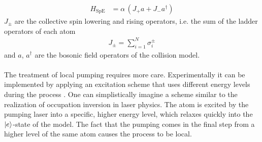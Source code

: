 \begin{align*}
    H_\text{SpE}&=\alpha\,(J_+a + J_-a^\dagger)
\end{align*}
$J_\pm$ are the collective spin lowering and rising operators, i.e. the sum of the ladder operators of each atom 
\begin{align*}
    J_\pm=\sum_{i=1}^N\sigma^\pm_i
\end{align*}
and $a$, $a^\dagger$ are the bosonic field operators of the collision model.\\\\


The treatment of local pumping requires more care. %
Experimentally it can be implemented by applying an excitation scheme that uses different energy levels during the process \cite{meiser_prospects_2009}. One can simplistically imagine a scheme similar to the realization of occupation inversion in laser physics. The atom is excited by the pumping laser into a specific, higher energy level, which relaxes quickly into the $\ket{e}$-state of the model. The fact that the pumping comes in the final step from a higher level of the same atom causes the process to be local.

